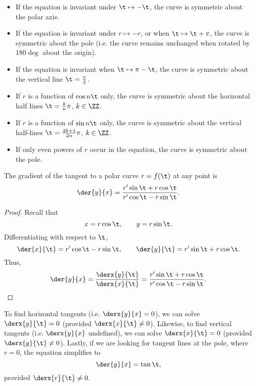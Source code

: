 \begin{fact}
    \phantom{.}
    \begin{itemize}
        \item If the equation is invariant under $\t \mapsto -\t$, the curve is symmetric about the polar axis.
        \item If the equation is invariant under $r \mapsto -r$, or when $\t \mapsto \t + \pi$, the curve is symmetric about the pole (i.e. the curve remains unchanged when rotated by $180\deg$ about the origin).
        \item If the equation is invariant when $\t \mapsto \pi - \t$, the curve is symmetric about the vertical line $\t = \frac\pi2$.
        \item If $r$ is a function of $\cos n\t$ only, the curve is symmetric about the horizontal half lines $\t = \frac{k}{n} \pi$, $k \in \ZZ$.
        \item If $r$ is a function of $\sin n\t$ only, the curve is symmetric about the vertical half-lines $\t = \frac{2k+1}{2n} \pi$, $k \in \ZZ$.
        \item If only even powers of $r$ occur in the equation, the curve is symmetric about the pole.
    \end{itemize}
\end{fact}

\begin{proposition}
    The gradient of the tangent to a polar curve $r = f(\t)$ at any point is \[\der{y}{x} = \frac{r' \sin \t + r \cos \t}{r' \cos \t - r \sin \t}.\]
\end{proposition}
\begin{proof}
    Recall that \[x = r\cos\t, \qquad y = r\sin\t.\] Differentiating with respect to $\t$, \[\der{x}{\t} = r' \cos \t - r\sin\t, \qquad \der{y}{\t} = r' \sin \t + r\cos\t.\] Thus, \[\der{y}{x} = \frac{\derx{y}{\t}}{\derx{x}{\t}} = \frac{r' \sin \t + r \cos \t}{r' \cos \t - r \sin \t}.\]
\end{proof}
\begin{remark}
    To find horizontal tangents (i.e. $\derx{y}{x} = 0$), we can solve $\derx{y}{\t} = 0$ (provided $\derx{x}{\t} \neq 0$). Likewise, to find vertical tangents (i.e. $\derx{y}{x}$ undefined), we can solve $\derx{x}{\t} = 0$ (provided $\derx{y}{\t} \neq 0$). Lastly, if we are looking for tangent lines at the pole, where $r = 0$, the equation simplifies to \[\der{y}{x} = \tan \t,\] provided $\derx{r}{\t} \neq 0$.
\end{remark}